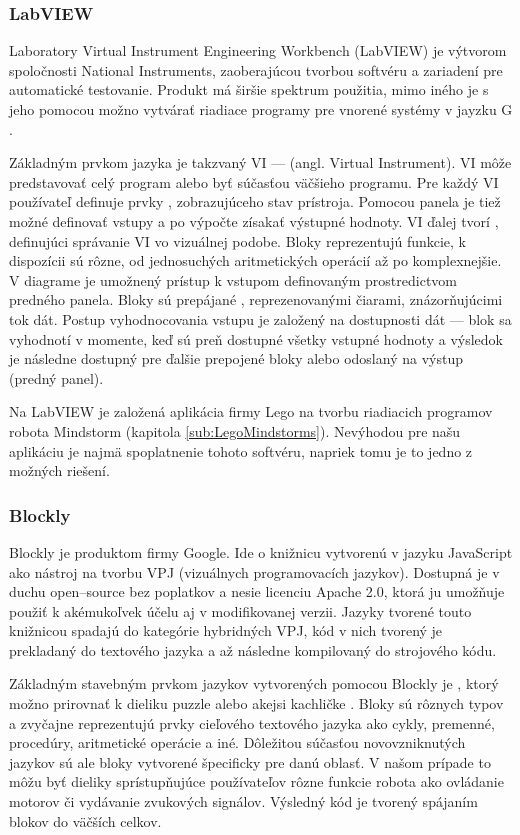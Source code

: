 \subsubsection{LabVIEW}
Laboratory Virtual Instrument Engineering Workbench (LabVIEW) je výtvorom spoločnosti National Instruments, zaoberajúcou tvorbou softvéru a zariadení pre automatické testovanie. Produkt má širšie spektrum použitia, mimo iného je s jeho pomocou možno vytvárať riadiace programy pre vnorené systémy v jayzku G \cite{LabVIEW}.

Základným prvkom jazyka je takzvaný VI ---  (angl. Virtual Instrument). VI môže predstavovať celý program alebo byť súčasťou väčšieho programu. Pre každý VI používateľ definuje prvky , zobrazujúceho stav prístroja. Pomocou panela je tiež možné definovať vstupy a po výpočte zísakať výstupné hodnoty. VI ďalej tvorí , definujúci správanie VI vo vizuálnej podobe. Bloky reprezentujú funkcie, k dispozícii sú rôzne, od jednosuchých aritmetických operácií až po komplexnejšie. V diagrame je umožnený prístup k vstupom definovaným prostredictvom predného panela. Bloky sú prepájané , reprezenovanými čiarami, znázorňujúcimi tok dát. Postup vyhodnocovania vstupu je založený na dostupnosti dát --- blok sa vyhodnotí v momente, keď sú preň dostupné všetky vstupné hodnoty a výsledok je následne dostupný pre ďalšie prepojené bloky alebo odoslaný na výstup (predný panel).

Na LabVIEW je založená aplikácia firmy Lego na tvorbu riadiacich programov robota Mindstorm (kapitola \ref{sub:LegoMindstorms}). Nevýhodou pre našu aplikáciu je najmä spoplatnenie tohoto softvéru, napriek tomu je to jedno z možných riešení.

\subsubsection{Blockly}
Blockly je produktom firmy Google. Ide o knižnicu vytvorenú v jazyku JavaScript ako nástroj na tvorbu VPJ (vizuálnych programovacích jazykov). Dostupná je v duchu open--source bez poplatkov a nesie licenciu Apache 2.0, ktorá ju umožňuje použiť k akémukoľvek účelu aj v modifikovanej verzii. Jazyky tvorené touto knižnicou spadajú do kategórie hybridných VPJ, kód v nich tvorený je prekladaný do textového jazyka a až následne kompilovaný do strojového kódu.

Základným stavebným prvkom jazykov vytvorených pomocou Blockly je , ktorý možno prirovnať k dieliku puzzle alebo akejsi kachličke \cite{pasternak2017tips}. Bloky sú rôznych typov a zvyčajne reprezentujú prvky cieľového textového jazyka ako cykly, premenné, procedúry, aritmetické operácie a iné. Dôležitou súčasťou novovzniknutých jazykov sú ale bloky vytvorené špecificky pre danú oblasť. V našom prípade to môžu byť dieliky sprístupňujúce používateľov rôzne funkcie robota ako ovládanie motorov či vydávanie zvukových signálov. Výsledný kód je tvorený spájaním blokov do väčších celkov.

